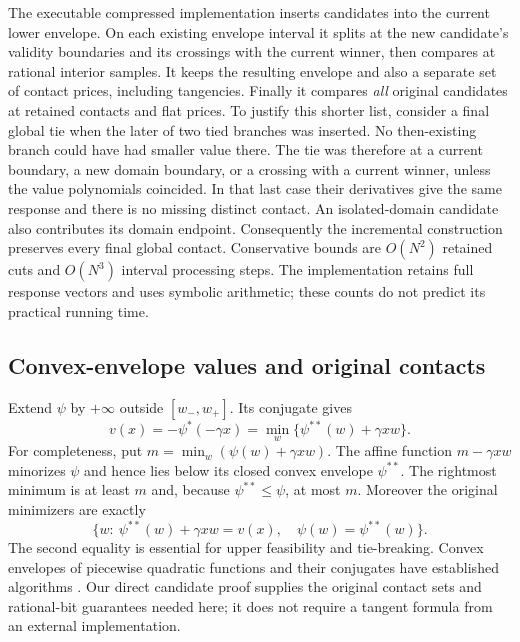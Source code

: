 The executable compressed implementation inserts candidates into the current
lower envelope. On each existing envelope interval it splits at the new
candidate's validity boundaries and its crossings with the current winner,
then compares at rational interior samples. It keeps the resulting envelope
and also a separate set of contact prices, including tangencies. Finally it
compares \emph{all} original candidates at retained contacts and flat prices.
To justify this shorter list, consider a final global tie when the later of
two tied branches was inserted. No then-existing branch could have had smaller
value there. The tie was therefore at a current boundary, a new domain
boundary, or a crossing with a current winner, unless the value polynomials
coincided. In that last case their derivatives give the same response and
there is no missing distinct contact. An isolated-domain candidate also
contributes its domain endpoint. Consequently the incremental construction
preserves every final global contact. Conservative bounds are $O(N^2)$ retained
cuts and $O(N^3)$ interval processing steps. The implementation retains full
response vectors and uses symbolic arithmetic; these counts do not predict
its practical running time.

\subsection{Convex-envelope values and original contacts}
\label{subsec:contacts}
Extend $\psi$ by $+\infty$ outside $[w_-,w_+]$. Its conjugate gives
\begin{equation}\label{eq:contact-conjugacy}
 v(x)=-\psi^*(-\gamma x)
     =\min_w\{\psi^{**}(w)+\gamma xw\}.
\end{equation}
For completeness, put $m=\min_w(\psi(w)+\gamma xw)$. The affine function
$m-\gamma xw$ minorizes $\psi$ and hence lies below its closed convex envelope
$\psi^{**}$. The rightmost minimum is at least $m$ and, because
$\psi^{**}\le\psi$, at most $m$. Moreover the original minimizers are exactly
\begin{equation}\label{eq:actual-contact}
 \{w:\ \psi^{**}(w)+\gamma xw=v(x),\quad \psi(w)=\psi^{**}(w)\}.
\end{equation}
The second equality is essential for upper feasibility and tie-breaking.
Convex envelopes of piecewise quadratic functions and their conjugates have
established algorithms \citep{GardinerLucet2010,MoehleEtAl2023}. Our direct
candidate proof supplies the original contact sets and rational-bit guarantees
needed here; it does not require a tangent formula from an external
implementation.

